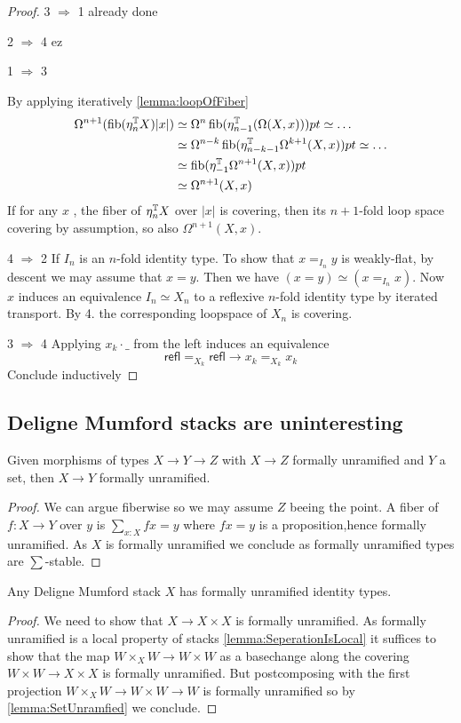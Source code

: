 \documentclass{article}
\newcommand{\refl}{\mathsf{refl}}
\begin{document}
\begin{proof}
	\item [3 $\Rightarrow$ 1] already done
	\item [2 $\Rightarrow$ 4] ez
	\item [1 $\Rightarrow$ 3]

	By applying iteratively \ref{lemma:loopOfFiber} 
	\begin{align*}
	\Omega^{n+1} (\operatorname{fib} (\eta_n^{\mathbb{T}} X) |x|) &\simeq \Omega^n \operatorname{fib} (\eta_{n-1}^{\mathbb{T}} (\Omega (X,x))) pt \simeq \hdots \\
	&\simeq \Omega^{n-k} \operatorname{fib}(\eta_{n-k-1}^{\mathbb{T}} \Omega^{k+1}(X,x)) pt \simeq \hdots \\
	&\simeq \operatorname{fib} (\eta_{-1}^{\mathbb{T}} \Omega^{n+1} (X,x)) pt \\
	&\simeq \Omega^{n+1} (X , x)
	\end{align*}
	If for any $x$ , the fiber of $\eta_n^{\mathbb{T}} X$ over $|x|$ is covering, then its $n+1$-fold loop space covering by assumption, so also $\Omega^{n+1} (X , x)$.	
	\item [4 $\Rightarrow$ 2] If $I_n$ is an $n$-fold identity type. To show that $x =_{I_n} y$ is weakly-flat, by descent we may assume that $x = y$. Then we have $(x = y) \simeq (x =_{I_n} x)$. Now $x$ induces an equivalence $I_n \simeq X_n$ to a reflexive $n$-fold identity type by iterated transport. By 4. the corresponding loopspace of $X_n$ is covering.
	\item [3 $\Rightarrow$ 4] Applying $x_k \cdot \_$ from the left induces an equivalence
	\[\refl =_{X_k} \refl \to x_k =_{X_k} x_k \]
	Conclude inductively
\end{proof}
\subsection{Deligne Mumford stacks are uninteresting}
\begin{lemma}{\label{lemma:SetUnramfied}}
	Given morphisms of types $X \to Y \to Z$ with $X \to Z$ formally unramified and $Y$ a set, then $X \to Y$ formally unramified.
\end{lemma}
\begin{proof}
	We can argue fiberwise so we may assume $Z$ beeing the point. A fiber of $f : X \to Y$ over $y$ is $\sum_{x: X} f x = y$ where $f x = y$ is a proposition,hence formally unramified. As $X$ is formally unramified we conclude as formally unramified types are $\sum$-stable.
\end{proof}
\begin{lemma}{\label{lemma:DMUnrIdTypes}}
	Any Deligne Mumford stack $X$ has formally unramified identity types.
\end{lemma}
\begin{proof}
	 We need to show that $X \to X \times X$ is formally unramified. As formally unramified is a local property of stacks \ref{lemma:SeperationIsLocal} it suffices to show that the map $W \times_X W \to W \times W$ as a basechange along the covering $W \times W \to X \times X$ is formally unramified. But postcomposing with the first projection $W \times_X W \to W \times W \to W$ is formally unramified so by \ref{lemma:SetUnramfied} we conclude.
\end{proof}
\end{document}
